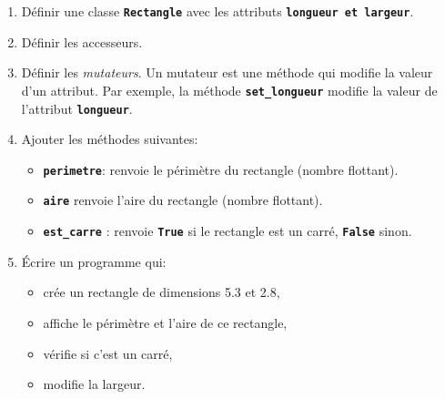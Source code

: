 \documentclass[a4paper,11pt]{article}
\begin{document}
\begin{exo}
    \begin{enumerate}
        \item Définir une classe \texttt{\textbf{Rectangle}} avec les attributs \texttt{\textbf{longueur et largeur}}.
        \item Définir les accesseurs.
        \item Définir les \emph{mutateurs}. Un mutateur est une méthode qui modifie la valeur d'un attribut. Par exemple, la méthode \textbf{\texttt{set\_longueur}} modifie la valeur de l'attribut \textbf{\texttt{longueur}}.
        \item Ajouter les méthodes suivantes:
              \begin{itemize}
                  \item \textbf{\texttt{perimetre}}: renvoie le périmètre du rectangle (nombre flottant).
                  \item \textbf{\texttt{aire}} renvoie l'aire du rectangle (nombre flottant).
                  \item \textbf{\texttt{est\_carre}} : renvoie \textbf{\texttt{True}} si le rectangle est un carré, \textbf{\texttt{False}} sinon.
              \end{itemize}
        \item Écrire un programme qui:
              \begin{itemize}
                  \item crée un rectangle de dimensions 5.3 et 2.8,
                  \item affiche le périmètre et l'aire de ce rectangle,
                  \item vérifie si c'est un carré,
                  \item modifie la largeur.
              \end{itemize}
    \end{enumerate}
\end{exo}
\end{document}

